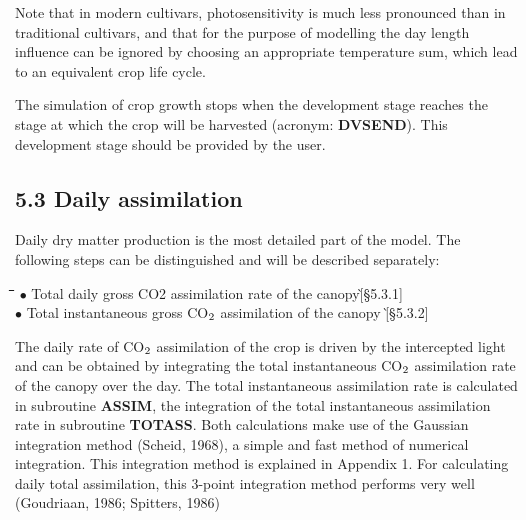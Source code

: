 \documentclass[11pt]{article}
\begin{document}
\bigskip
Note that in modern cultivars, photosen\-sitivity is much less pronounced than in traditional
cultivars, and that for the purpose of modelling the day length influence can be ignored
by choosing an appropriate temperature sum, which lead to  an equivalent crop life cycle.

\bigskip
The simulation of crop growth stops when the development stage reaches the stage at
which the crop will be harvested (acronym: {\bf DVSEND}). This development stage should be
provided by the user. 

\bigskip

\newpage

\subsection{  5.3 Daily assimilation  } 

Daily dry matter production is the most detailed part of the model. The following steps
can be distinguished and will be described separately:\nwln
\begin{tabbing}
\hspace{1.27cm}\=\hspace{1.27cm}\=\hspace{1.27cm}\=\hspace{1.27cm}\=%
\hspace{1.27cm}\=\hspace{1.27cm}\=\hspace{1.27cm}\=\hspace{1.27cm}\=%
\hspace{1.27cm}\=\hspace{1.27cm}\=\kill
$\bullet$ \> Total daily gross CO2 assimilation rate of the canopy\`[\S 5.3.1]\\
$\bullet$\> Total instantaneous gross CO$_{{\rm 2}}$ assimilation of the canopy \`[\S 5.3.2]
\end{tabbing}

 \bigskip
The daily rate of CO$_{{\rm 2}}$ assimilation of the crop is driven by the intercepted light and can
be obtained by integrating the total instanta\-neous CO$_{{\rm 2}}$ assimilation rate of the canopy over
the day. The total instantaneous assimilation rate is calculated in subrou\-tine {\bf ASSIM}, the
integra\-tion of the total instantaneous assimilation rate in subrou\-tine {\bf TOTASS}. Both
calcula\-tions make use of the Gaussian integration method (Scheid, 1968), a simple and
fast method of numerical integration. This integration method is explained in Appendix 1.
For calculat\-ing daily total assimilation, this 3-point integration method performs very well
(Goudria\-an, 1986; Spitters, 1986)
\end{document}
